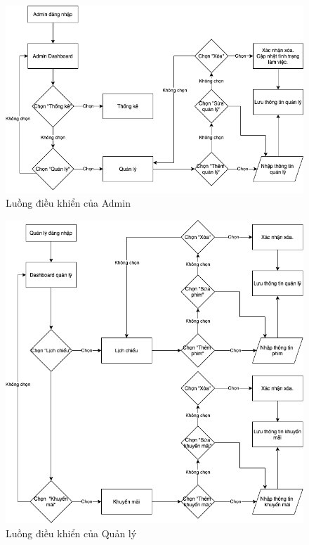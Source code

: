\documentclass[a4paper, 12pt]{article}
\begin{document}
\begin{figure}[H]
	\begin{center}
		\includegraphics[scale = 0.6]{GCF Charts/GCF_Admin.png}
		\caption{Luồng điều khiển của Admin}
	\end{center}
\end{figure}

\begin{figure}[H]
	\begin{center}
		\includegraphics[scale = 0.6]{GCF Charts/GCF_Manager.png}
		\caption{Luồng điều khiển của Quản lý}
	\end{center}
\end{figure}
\end{document}
